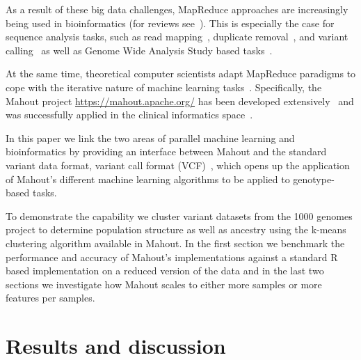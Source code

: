 \documentclass[twocolumn]{bmcart}%
\begin{document}
As a result of these big data challenges, MapReduce approaches are increasingly being used in bioinformatics (for reviews see~\cite{Zou2013, Qiu2010,Taylor2010}). This is especially the case for sequence analysis tasks, such as read mapping~\cite{Schatz2009}, duplicate removal~\cite{Jourdren2012}, and variant calling~\cite{Langmead2009, McKenna2010} as well as Genome Wide Analysis Study based tasks~\cite{Huang2013, Guo2014}.

At the same time, theoretical computer scientists adapt MapReduce paradigms to cope with the iterative nature of machine learning tasks~\cite{Chu2009}. Specifically, the Mahout project \url{https://mahout.apache.org/} has been developed extensively~\cite{Ranger2007, Owen2011} and was successfully applied in the clinical informatics space~\cite{Dong2013}.

In this paper we link the two areas of parallel machine learning and bioinformatics by providing an interface between Mahout and the standard variant data format, variant call format (VCF)~\cite{1KG2012}, which opens up the application of Mahout's different machine learning algorithms to be applied to genotype-based tasks. 

To demonstrate the capability we cluster variant datasets from the 1000 genomes project to determine population structure as well as ancestry using the k-means clustering algorithm available in Mahout. In the first section we benchmark the performance and accuracy of Mahout's implementations against a standard R based implementation on a reduced version of the data and in the last two sections we investigate how Mahout scales to either more samples or more features per samples.   








\section*{Results and discussion}

\end{document}
